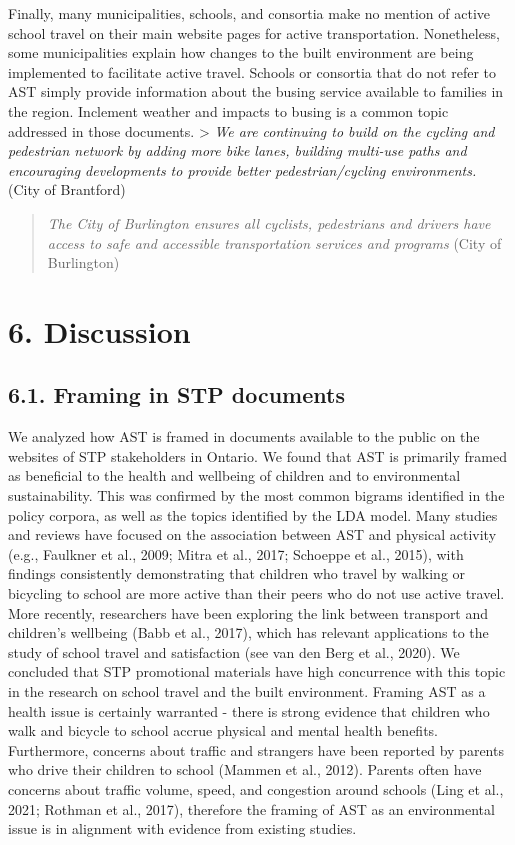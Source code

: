 \documentclass[]{elsarticle} %
\begin{document}
Finally, many municipalities, schools, and consortia make no mention of
active school travel on their main website pages for active
transportation. Nonetheless, some municipalities explain how changes to
the built environment are being implemented to facilitate active travel.
Schools or consortia that do not refer to AST simply provide information
about the busing service available to families in the region. Inclement
weather and impacts to busing is a common topic addressed in those
documents. \textgreater{} \emph{We are continuing to build on the
cycling and pedestrian network by adding more bike lanes, building
multi-use paths and encouraging developments to provide better
pedestrian/cycling environments.} (City of Brantford)

\begin{quote}
\emph{The City of Burlington ensures all cyclists, pedestrians and
drivers have access to safe and accessible transportation services and
programs} (City of Burlington)
\end{quote}

\hypertarget{discussion}{%
\section{6. Discussion}\label{discussion}}

\hypertarget{framing-in-stp-documents}{%
\subsection{6.1. Framing in STP
documents}\label{framing-in-stp-documents}}

We analyzed how AST is framed in documents available to the public on
the websites of STP stakeholders in Ontario. We found that AST is
primarily framed as beneficial to the health and wellbeing of children
and to environmental sustainability. This was confirmed by the most
common bigrams identified in the policy corpora, as well as the topics
identified by the LDA model. Many studies and reviews have focused on
the association between AST and physical activity (e.g., Faulkner et
al., 2009; Mitra et al., 2017; Schoeppe et al., 2015), with findings
consistently demonstrating that children who travel by walking or
bicycling to school are more active than their peers who do not use
active travel. More recently, researchers have been exploring the link
between transport and children's wellbeing (Babb et al., 2017), which
has relevant applications to the study of school travel and satisfaction
(see van den Berg et al., 2020). We concluded that STP promotional
materials have high concurrence with this topic in the research on
school travel and the built environment. Framing AST as a health issue
is certainly warranted - there is strong evidence that children who walk
and bicycle to school accrue physical and mental health benefits.
Furthermore, concerns about traffic and strangers have been reported by
parents who drive their children to school (Mammen et al., 2012).
Parents often have concerns about traffic volume, speed, and congestion
around schools (Ling et al., 2021; Rothman et al., 2017), therefore the
framing of AST as an environmental issue is in alignment with evidence
from existing studies.
\end{document}
